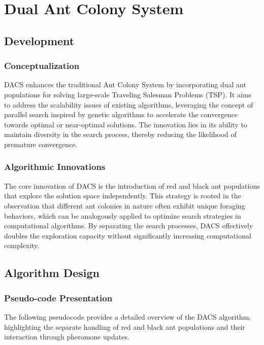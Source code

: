 \chapter{Dual Ant Colony System}\label{chapt:6}

\section{Development}

\subsection{Conceptualization}
DACS enhances the traditional Ant Colony System by incorporating dual ant populations for solving large-scale Traveling Salesman Problems (TSP). It aims to address the scalability issues of existing algorithms, leveraging the concept of parallel search inspired by genetic algorithms to accelerate the convergence towards optimal or near-optimal solutions. The innovation lies in its ability to maintain diversity in the search process, thereby reducing the likelihood of premature convergence.

\subsection{Algorithmic Innovations}
The core innovation of DACS is the introduction of red and black ant populations that explore the solution space independently. This strategy is rooted in the observation that different ant colonies in nature often exhibit unique foraging behaviors, which can be analogously applied to optimize search strategies in computational algorithms. By separating the search processes, DACS effectively doubles the exploration capacity without significantly increasing computational complexity.


\section{Algorithm Design}

\subsection{Pseudo-code Presentation}
The following pseudocode provides a detailed overview of the DACS algorithm, highlighting the separate handling of red and black ant populations and their interaction through pheromone updates.

